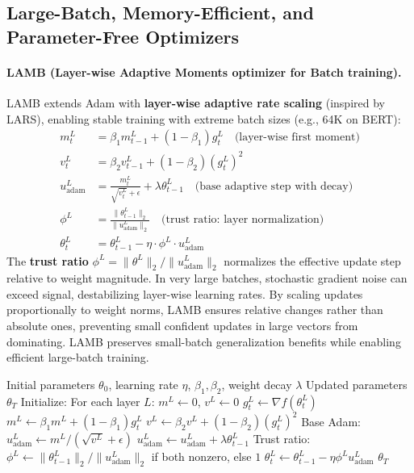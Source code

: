 \subsection{Large-Batch, Memory-Efficient, and Parameter-Free Optimizers}
\paragraph{LAMB (Layer-wise Adaptive Moments optimizer for Batch training).}
LAMB extends Adam with \textbf{layer-wise adaptive rate scaling} (inspired by LARS), enabling stable training with extreme batch sizes (e.g., 64K on BERT):
\begin{align}
m_t^L &= \beta_1 m_{t-1}^L + (1-\beta_1)g_t^L \quad\text{(layer-wise first moment)} \\
v_t^L &= \beta_2 v_{t-1}^L + (1-\beta_2)(g_t^L)^2 \\
u_{\text{adam}}^L &= \frac{m_t^L}{\sqrt{v_t^L}+\epsilon} + \lambda\theta_{t-1}^L \quad\text{(base adaptive step with decay)} \\
\phi^L &= \frac{\|\theta_{t-1}^L\|_2}{\|u_{\text{adam}}^L\|_2} \quad\text{(trust ratio: layer normalization)} \\
\theta_t^L &= \theta_{t-1}^L - \eta \cdot \phi^L \cdot u_{\text{adam}}^L
\end{align}
The \textbf{trust ratio} $\phi^L = \|\theta^L\|_2 / \|u_{\text{adam}}^L\|_2$ normalizes the effective update step relative to weight magnitude. In very large batches, stochastic gradient noise can exceed signal, destabilizing layer-wise learning rates. By scaling updates proportionally to weight norms, LAMB ensures relative changes rather than absolute ones, preventing small confident updates in large vectors from dominating. LAMB preserves small-batch generalization benefits while enabling efficient large-batch training.

\begin{algorithm}[H]
\caption{LAMB (Layer-wise Adaptive Moments optimizer for Batch training)}
\label{alg:lamb}
\begin{algorithmic}[1]
\Require Initial parameters $\theta_0$, learning rate $\eta$, $\beta_1, \beta_2$, weight decay $\lambda$
\Ensure Updated parameters $\theta_T$
\State Initialize: For each layer $L$: $m^L \gets 0$, $v^L \gets 0$
        \State $g_t^L \gets \nabla f(\theta_t^L)$
        \State $m^L \gets \beta_1 m^L + (1-\beta_1) g_t^L$
        \State $v^L \gets \beta_2 v^L + (1-\beta_2) (g_t^L)^2$
        \State Base Adam: $u_{\text{adam}}^L \gets m^L / (\sqrt{v^L} + \epsilon)$
            \State $u_{\text{adam}}^L \gets u_{\text{adam}}^L + \lambda \theta_{t-1}^L$
        \EndIf
        \State Trust ratio: $\phi^L \gets \|\theta_{t-1}^L\|_2 / \|u_{\text{adam}}^L\|_2$ if both nonzero, else $1$
        \State $\theta_t^L \gets \theta_{t-1}^L - \eta \phi^L u_{\text{adam}}^L$
    \EndFor
\EndFor
\Return $\theta_T$
\end{algorithmic}
\end{algorithm}

